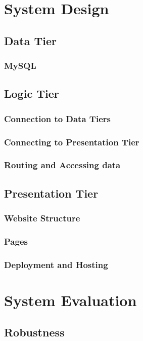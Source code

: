 \chapter{System Design}

\section{Data Tier}
\subsection{MySQL}

\section{Logic Tier}
\subsection{Connection to Data Tiers}
\subsection{Connecting to Presentation Tier}
\subsection{Routing and Accessing data}


\section{Presentation Tier}
\subsection{Website Structure}
\subsection{Pages}
\subsection{Deployment and Hosting}

\chapter{System Evaluation}
\section{Robustness}


